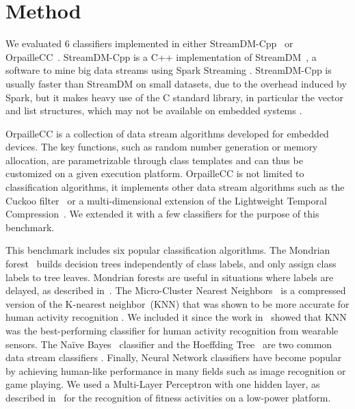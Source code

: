 \section{Method}
We evaluated 6 classifiers implemented in
either StreamDM-Cpp~\cite{StreamDM-CPP} or
OrpailleCC~\cite{OrpailleCC}.  StreamDM-Cpp is a
C++ implementation of StreamDM~\cite{StreamDM}, a
software to mine big data streams using Spark
Streaming . StreamDM-Cpp is usually faster than
StreamDM on small datasets, due to
the overhead induced by Spark, but it makes heavy
use of the C standard library, in particular the vector and
list structures, which may not be available on embedded systems
 .

OrpailleCC is a
collection of data stream algorithms developed for embedded devices. The key
functions, such as random number generation or memory allocation, are
parametrizable through class templates and can thus be customized 
on a given execution platform.
OrpailleCC is not limited to classification
algorithms, it implements other data stream
algorithms such as the Cuckoo filter~\cite{cuckoo}
or a multi-dimensional extension of the
Lightweight Temporal Compression~\cite{multi-ltc}. We extended it with 
a few classifiers for the purpose of this benchmark.

This benchmark includes six popular classification algorithms.  The Mondrian
forest~\cite{mondrian2014} builds decision trees independently of class labels,
and only assign class labels to tree leaves. Mondrian forests are useful in
situations where labels are delayed, as described
in~\cite{stream_learning_review}.  The Micro-Cluster Nearest
Neighbors~\cite{mc-nn} is a compressed version of the K-nearest
neighbor~(KNN) that was shown to be more accurate for human activity
recognition . We included
it since the work in~\cite{Janidarmian_2017} showed that KNN was the
best-performing classifier for human activity recognition from wearable
sensors.  The Naïve Bayes~\cite{naive_bayes} classifier
and the Hoeffding Tree~\cite{VFDT} are two common data stream classifiers .
Finally, Neural Network classifiers have
become popular by achieving human-like performance in many fields such as image
recognition or game playing. We used a
Multi-Layer Perceptron with one hidden layer, as described in~\cite{omid_2019} for the recognition 
of fitness activities on a low-power platform.


